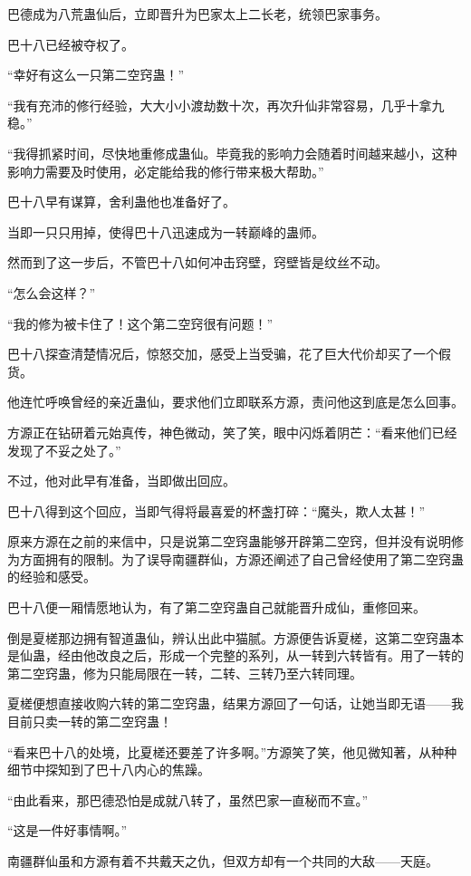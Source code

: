 \begin{this_body}
巴德成为八荒蛊仙后，立即晋升为巴家太上二长老，统领巴家事务。

巴十八已经被夺权了。

“幸好有这么一只第二空窍蛊！”

“我有充沛的修行经验，大大小小渡劫数十次，再次升仙非常容易，几乎十拿九稳。”

“我得抓紧时间，尽快地重修成蛊仙。毕竟我的影响力会随着时间越来越小，这种影响力需要及时使用，必定能给我的修行带来极大帮助。”

巴十八早有谋算，舍利蛊他也准备好了。

当即一只只用掉，使得巴十八迅速成为一转巅峰的蛊师。

然而到了这一步后，不管巴十八如何冲击窍壁，窍壁皆是纹丝不动。

“怎么会这样？”

“我的修为被卡住了！这个第二空窍很有问题！”

巴十八探查清楚情况后，惊怒交加，感受上当受骗，花了巨大代价却买了一个假货。

他连忙呼唤曾经的亲近蛊仙，要求他们立即联系方源，责问他这到底是怎么回事。

方源正在钻研着元始真传，神色微动，笑了笑，眼中闪烁着阴芒：“看来他们已经发现了不妥之处了。”

不过，他对此早有准备，当即做出回应。

巴十八得到这个回应，当即气得将最喜爱的杯盏打碎：“魔头，欺人太甚！”

原来方源在之前的来信中，只是说第二空窍蛊能够开辟第二空窍，但并没有说明修为方面拥有的限制。为了误导南疆群仙，方源还阐述了自己曾经使用了第二空窍蛊的经验和感受。

巴十八便一厢情愿地认为，有了第二空窍蛊自己就能晋升成仙，重修回来。

倒是夏槎那边拥有智道蛊仙，辨认出此中猫腻。方源便告诉夏槎，这第二空窍蛊本是仙蛊，经由他改良之后，形成一个完整的系列，从一转到六转皆有。用了一转的第二空窍蛊，修为只能局限在一转，二转、三转乃至六转同理。

夏槎便想直接收购六转的第二空窍蛊，结果方源回了一句话，让她当即无语——我目前只卖一转的第二空窍蛊！

“看来巴十八的处境，比夏槎还要差了许多啊。”方源笑了笑，他见微知著，从种种细节中探知到了巴十八内心的焦躁。

“由此看来，那巴德恐怕是成就八转了，虽然巴家一直秘而不宣。”

“这是一件好事情啊。”

南疆群仙虽和方源有着不共戴天之仇，但双方却有一个共同的大敌——天庭。


\end{this_body}
